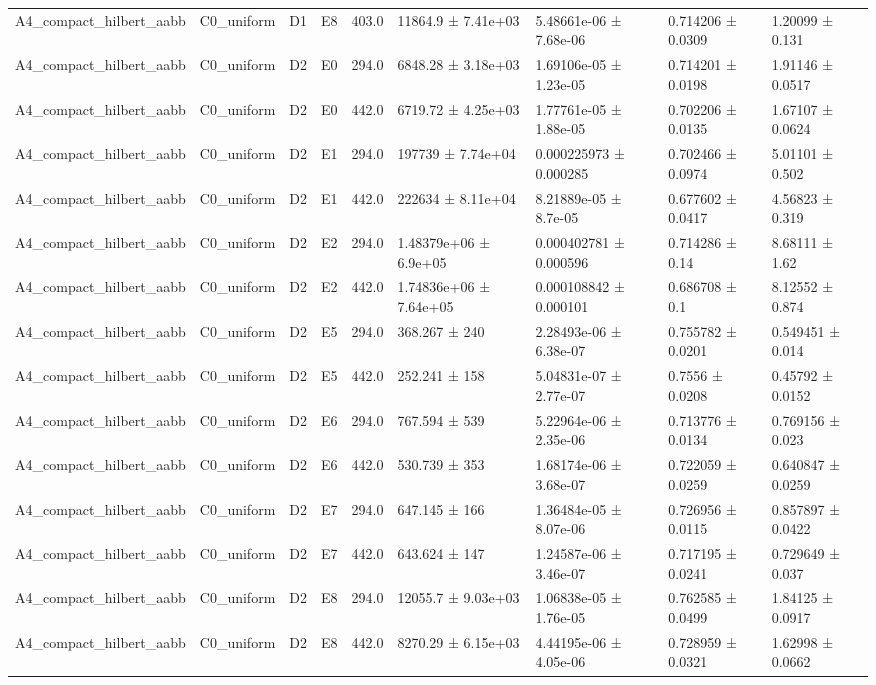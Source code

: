 \begin{table}
\begin{tabular}{lllllllll}
A4\_compact\_hilbert\_aabb & C0\_uniform & D1 & E8 & 403.0 & 11864.9 ± 7.41e+03 & 5.48661e-06 ± 7.68e-06 & 0.714206 ± 0.0309 & 1.20099 ± 0.131 \\
A4\_compact\_hilbert\_aabb & C0\_uniform & D2 & E0 & 294.0 & 6848.28 ± 3.18e+03 & 1.69106e-05 ± 1.23e-05 & 0.714201 ± 0.0198 & 1.91146 ± 0.0517 \\
A4\_compact\_hilbert\_aabb & C0\_uniform & D2 & E0 & 442.0 & 6719.72 ± 4.25e+03 & 1.77761e-05 ± 1.88e-05 & 0.702206 ± 0.0135 & 1.67107 ± 0.0624 \\
A4\_compact\_hilbert\_aabb & C0\_uniform & D2 & E1 & 294.0 & 197739 ± 7.74e+04 & 0.000225973 ± 0.000285 & 0.702466 ± 0.0974 & 5.01101 ± 0.502 \\
A4\_compact\_hilbert\_aabb & C0\_uniform & D2 & E1 & 442.0 & 222634 ± 8.11e+04 & 8.21889e-05 ± 8.7e-05 & 0.677602 ± 0.0417 & 4.56823 ± 0.319 \\
A4\_compact\_hilbert\_aabb & C0\_uniform & D2 & E2 & 294.0 & 1.48379e+06 ± 6.9e+05 & 0.000402781 ± 0.000596 & 0.714286 ± 0.14 & 8.68111 ± 1.62 \\
A4\_compact\_hilbert\_aabb & C0\_uniform & D2 & E2 & 442.0 & 1.74836e+06 ± 7.64e+05 & 0.000108842 ± 0.000101 & 0.686708 ± 0.1 & 8.12552 ± 0.874 \\
A4\_compact\_hilbert\_aabb & C0\_uniform & D2 & E5 & 294.0 & 368.267 ± 240 & 2.28493e-06 ± 6.38e-07 & 0.755782 ± 0.0201 & 0.549451 ± 0.014 \\
A4\_compact\_hilbert\_aabb & C0\_uniform & D2 & E5 & 442.0 & 252.241 ± 158 & 5.04831e-07 ± 2.77e-07 & 0.7556 ± 0.0208 & 0.45792 ± 0.0152 \\
A4\_compact\_hilbert\_aabb & C0\_uniform & D2 & E6 & 294.0 & 767.594 ± 539 & 5.22964e-06 ± 2.35e-06 & 0.713776 ± 0.0134 & 0.769156 ± 0.023 \\
A4\_compact\_hilbert\_aabb & C0\_uniform & D2 & E6 & 442.0 & 530.739 ± 353 & 1.68174e-06 ± 3.68e-07 & 0.722059 ± 0.0259 & 0.640847 ± 0.0259 \\
A4\_compact\_hilbert\_aabb & C0\_uniform & D2 & E7 & 294.0 & 647.145 ± 166 & 1.36484e-05 ± 8.07e-06 & 0.726956 ± 0.0115 & 0.857897 ± 0.0422 \\
A4\_compact\_hilbert\_aabb & C0\_uniform & D2 & E7 & 442.0 & 643.624 ± 147 & 1.24587e-06 ± 3.46e-07 & 0.717195 ± 0.0241 & 0.729649 ± 0.037 \\
A4\_compact\_hilbert\_aabb & C0\_uniform & D2 & E8 & 294.0 & 12055.7 ± 9.03e+03 & 1.06838e-05 ± 1.76e-05 & 0.762585 ± 0.0499 & 1.84125 ± 0.0917 \\
A4\_compact\_hilbert\_aabb & C0\_uniform & D2 & E8 & 442.0 & 8270.29 ± 6.15e+03 & 4.44195e-06 ± 4.05e-06 & 0.728959 ± 0.0321 & 1.62998 ± 0.0662 \\

\end{tabular}
\end{table}
